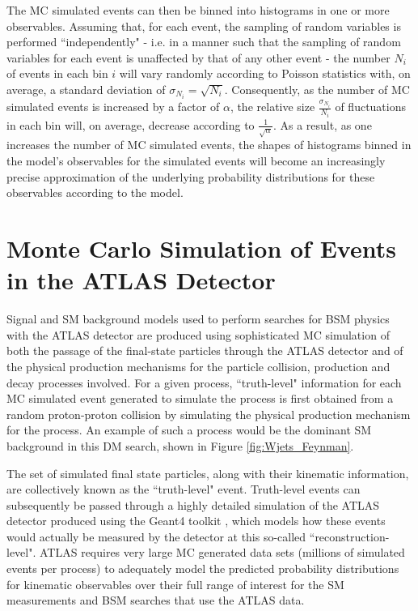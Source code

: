 The MC simulated events can then be binned into histograms in one or more observables. Assuming that, for each event, the sampling of random variables is performed ``independently" - i.e. in a manner such that the sampling of random variables for each event is unaffected by that of any other event - the number $N_i$ of events in each bin $i$ will vary randomly according to Poisson statistics with, on average, a standard deviation of $\sigma_{N_i}=\sqrt{N_i}$. Consequently, as the number of MC simulated events is increased by a factor of $\alpha$, the relative size $\frac{\sigma_{N_i}}{N_i}$ of fluctuations in each bin will, on average, decrease according to $\frac{1}{\sqrt{\alpha}}$. As a result, as one increases the number of MC simulated events, the shapes of histograms binned in the model's observables for the simulated events will become an increasingly precise approximation of the underlying probability distributions for these observables according to the model. 

\section{Monte Carlo Simulation of Events in the ATLAS Detector}
\label{sec:MC_ATLAS}

Signal and SM background models used to perform searches for BSM physics with the ATLAS detector are produced using sophisticated MC simulation of both the passage of the final-state particles through the ATLAS detector and of the physical production mechanisms for the particle collision, production and decay processes involved. For a given process, ``truth-level" information for each MC simulated event generated to simulate the process is first obtained from a random proton-proton collision by simulating the physical production mechanism for the process. An example of such a process would be the dominant \wjets SM background in this DM search, shown in Figure \ref{fig:Wjets_Feynman}.

The set of simulated final state particles, along with their kinematic information, are collectively known as the ``truth-level" event. Truth-level events can subsequently be passed through a highly detailed simulation of the ATLAS detector \cite{atlas_sim} produced using the Geant4 toolkit \cite{Geant4}, which models how these events would actually be measured by the detector at this so-called ``reconstruction-level". ATLAS requires very large MC generated data sets (millions of simulated events per process) to adequately model the predicted probability distributions for kinematic observables over their full range of interest for the SM measurements and BSM searches that use the ATLAS data.

